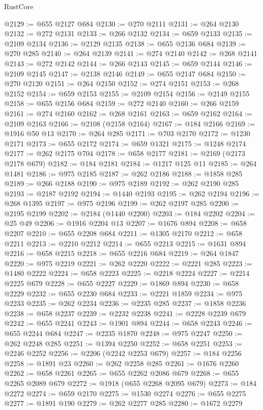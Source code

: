 \begin{lexlean}{RustCore}
\begin{coremodule}
@2129 := @655 @2127 @684
@2130 := @270 @2111
@2131 := @264 @2130
@2132 := @272 @2131
@2133 := @266 @2132
@2134 := @659 @2133
@2135 := @2109 @2134
@2136 := @2129 @2135
@2138 := @655 @2136 @684
@2139 := @270 @285
@2140 := @264 @2139
@2141 := @274 @2140
@2142 := @268 @2141
@2143 := @272 @2142
@2144 := @266 @2143
@2145 := @659 @2144
@2146 := @2109 @2145
@2147 := @2138 @2146
@2149 := @655 @2147 @684
@2150 := @270 @2120
@2151 := @264 @2150
@2152 := @274 @2151
@2153 := @268 @2152
@2154 := @659 @2153
@2155 := @2109 @2154
@2156 := @2149 @2155
@2158 := @655 @2156 @684
@2159 := @272 @2140
@2160 := @266 @2159
@2161 := @274 @2160
@2162 := @268 @2161
@2163 := @659 @2162
@2164 := @2109 @2163
@2166 := @2108 (@2158 @2164)
@2167 := @184 @2166
@2169 := @1916 @50 @13
@2170 := @264 @285
@2171 := @703 @2170
@2172 := @1230 @2171
@2173 := @655 @2172
@2174 := @659 @1321
@2175 := @1248 @2174
@2177 := @262 @2175 @704
@2178 := @658 @2177
@2181 := @2169 (@2173 @2178 @679)
@2182 := @184 @2181
@2184 := @1217 @125 @11
@2185 := @264 @1481
@2186 := @975 @2185
@2187 := @262 @2186
@2188 := @1858 @285
@2189 := @266 @2188
@2190 := @975 @2189
@2192 := @262 @2190 @285
@2193 := @2187 @2192
@2194 := @1440 @2193
@2195 := @262 @2194
@2196 := @268 @1395
@2197 := @975 @2196
@2199 := @262 @2197 @285
@2200 := @2195 @2199
@2202 := @2184 (@1440 @2200)
@2203 := @184 @2202
@2204 := @25 @49
@2206 := @1916 @2204 @13
@2207 := @1676 @894
@2208 := @658 @2207
@2210 := @655 @2208 @684
@2211 := @1305 @2170
@2212 := @658 @2211
@2213 := @2210 @2212
@2214 := @655 @2213
@2215 := @1631 @894
@2216 := @658 @2215
@2218 := @655 @2216 @684
@2219 := @264 @1847
@2220 := @975 @2219
@2221 := @262 @2220
@2222 := @2221 @285
@2223 := @1480 @2222
@2224 := @658 @2223
@2225 := @2218 @2224
@2227 := @2214 @2225 @679
@2228 := @655 @2227
@2229 := @1869 @894
@2230 := @658 @2229
@2232 := @655 @2230 @684
@2233 := @2221 @1859
@2234 := @975 @2233
@2235 := @262 @2234
@2236 := @2235 @285
@2237 := @1858 @2236
@2238 := @658 @2237
@2239 := @2232 @2238
@2241 := @2228 @2239 @679
@2242 := @655 @2241
@2243 := @1901 @894
@2244 := @658 @2243
@2246 := @655 @2244 @684
@2247 := @2235 @1870
@2248 := @975 @2247
@2250 := @262 @2248 @285
@2251 := @1394 @2250
@2252 := @658 @2251
@2253 := @2246 @2252
@2256 := @2206 (@2242 @2253 @679)
@2257 := @184 @2256
@2258 := @1891 @23
@2260 := @262 @2258 @285
@2261 := @1676 @2260
@2262 := @658 @2261
@2265 := @655 @2262 @2086 @679
@2268 := @655 @2265 @2089 @679
@2272 := @1918 (@655 @2268 @2095 @679)
@2273 := @184 @2272
@2274 := @659 @2170
@2275 := @1530 @2274
@2276 := @655 @2275
@2277 := @1891 @190
@2279 := @262 @2277 @285
@2280 := @1672 @2279

\end{coremodule}
\end{lexlean}
